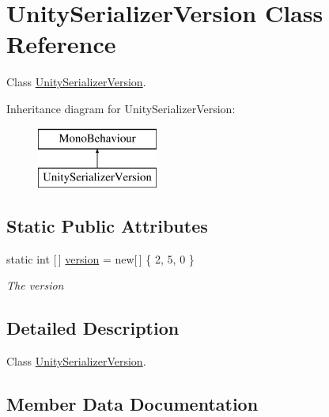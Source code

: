 \hypertarget{class_unity_serializer_version}{}\section{Unity\+Serializer\+Version Class Reference}
\label{class_unity_serializer_version}


Class \hyperlink{class_unity_serializer_version}{Unity\+Serializer\+Version}.  


Inheritance diagram for Unity\+Serializer\+Version\+:\begin{figure}[H]
\begin{center}
\leavevmode
\includegraphics[height=2.000000cm]{class_unity_serializer_version}
\end{center}
\end{figure}
\subsection*{Static Public Attributes}
\begin{DoxyCompactItemize}
\item 
static int \mbox{[}$\,$\mbox{]} \hyperlink{class_unity_serializer_version_a96486ed1d2a8cc194977e71c0625a94b}{version} = new\mbox{[}$\,$\mbox{]} \{ 2, 5, 0 \}
\begin{DoxyCompactList}\small\item\em The version \end{DoxyCompactList}\end{DoxyCompactItemize}


\subsection{Detailed Description}
Class \hyperlink{class_unity_serializer_version}{Unity\+Serializer\+Version}. 



\subsection{Member Data Documentation}
\mbox{\label{class_unity_serializer_version_a96486ed1d2a8cc194977e71c0625a94b}} 
